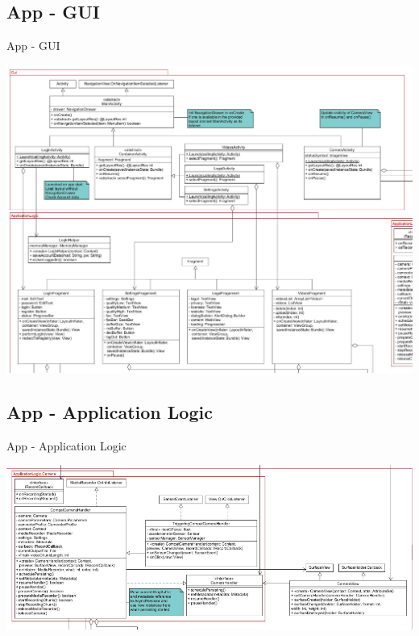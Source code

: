 \documentclass[19pt]{beamer}
\begin{document}
\subsection{App - GUI}
\begin{frame}{App - GUI}
\begin{center}
\includegraphics[scale=0.25]{resources/app_gui.png}
\end{center}
\end{frame}
\subsection{App - Application Logic}
\begin{frame}{App - Application Logic}
\begin{center}
\includegraphics[scale=0.3]{resources/app_applogic.png}
\end{center}
\end{frame}
\end{document}
